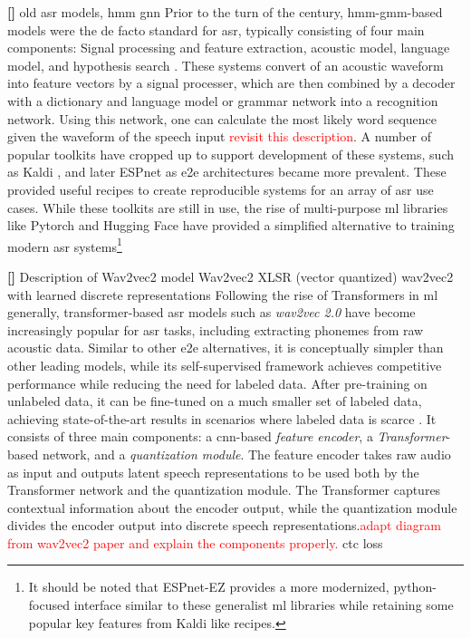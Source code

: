 \documentclass[thesis]{cluu}
\newcounter{paranum}
\newcommand{\numberedparagraph}{\par\refstepcounter{paranum}\textbf{[\theparanum] }}
\newcommand{\todo}[1]{\textcolor{red}{#1}}
\begin{document}
\numberedparagraph{old asr models, hmm gnn}
Prior to the turn of the century, \gls{hmm}-\gls{gmm}-based models were the de facto standard for \gls{asr}, typically consisting of four main components: Signal processing and feature extraction, acoustic model, language model, and hypothesis search \parencite{yuAutomaticSpeechRecognition2015}. These systems convert of an acoustic waveform into feature vectors by a signal processer, which are then combined by a decoder with a dictionary and language model or grammar network into a recognition network. Using this network, one can calculate the most likely word sequence given the waveform of the speech input \parencite{witt2000use} \todo{revisit this description}. A number of popular toolkits have cropped up to support development of these systems, such as Kaldi \parencite{poveyKaldiSpeechRecognition}, and later ESPnet \parencite{watanabeESPnetEndtoEndSpeech2018} as \gls{e2e} architectures became more prevalent. These provided useful recipes to create reproducible systems for an array of \gls{asr} use cases. While these toolkits are still in use, the rise of multi-purpose \gls{ml} libraries like Pytorch \parencite{paszkePyTorchImperativeStyle2019} and Hugging Face \parencite{wolfTransformersStateoftheArtNatural2020} have provided a simplified alternative to training modern \gls{asr} systems\footnote{It should be noted that ESPnet-EZ \parencite{somekiESPnetEZPythononlyESPnet2024} provides a more modernized, python-focused interface similar to these generalist \gls{ml} libraries while retaining some popular key features from Kaldi like recipes.} 

\numberedparagraph{Description of Wav2vec2 model}
\textcite{conneauUnsupervisedCrosslingualRepresentation2020} Wav2vec2 XLSR
\textcite{baevskiVqwav2vecSelfSupervisedLearning2020} (vector quantized) wav2vec2 with learned discrete representations
Following the rise of Transformers in \gls{ml} generally, transformer-based \gls{asr} models such as \textit{wav2vec 2.0} have become increasingly popular for \gls{asr} tasks, including extracting phonemes from raw acoustic data. Similar to other \gls{e2e} alternatives, it is conceptually simpler than other leading models, while its self-supervised framework achieves competitive performance while reducing the need for labeled data. After pre-training on unlabeled data, it can be fine-tuned on a much smaller set of labeled data, achieving state-of-the-art results in scenarios where labeled data is scarce \textcite{baevskiWav2vec20Framework2020a}. It consists of three main components: a \gls{cnn}-based \textit{feature encoder}, a \textit{Transformer}-based network, and a \textit{quantization module}. The feature encoder takes raw audio as input and outputs latent speech representations to be used both by the Transformer network and the quantization module. The Transformer captures contextual information about the encoder output, while the quantization module divides the encoder output into discrete speech representations.\todo{adapt diagram from wav2vec2 paper and explain the components properly.}  \textcite{graves2006connectionist} ctc loss
\end{document}
